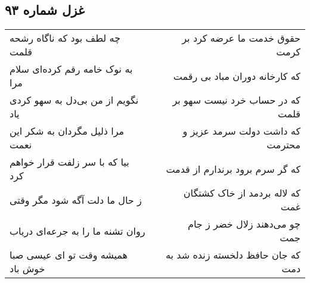\begin{center}
\section*{غزل شماره ۹۳}
\label{sec:sh093}
\begin{longtable}{l p{0.5cm} r}
چه لطف بود که ناگاه رشحه قلمت
&&
حقوق خدمت ما عرضه کرد بر کرمت
\\
به نوک خامه رقم کرده‌ای سلام مرا
&&
که کارخانه دوران مباد بی رقمت
\\
نگویم از من بی‌دل به سهو کردی یاد
&&
که در حساب خرد نیست سهو بر قلمت
\\
مرا ذلیل مگردان به شکر این نعمت
&&
که داشت دولت سرمد عزیز و محترمت
\\
بیا که با سر زلفت قرار خواهم کرد
&&
که گر سرم برود برندارم از قدمت
\\
ز حال ما دلت آگه شود مگر وقتی
&&
که لاله بردمد از خاک کشتگان غمت
\\
روان تشنه ما را به جرعه‌ای دریاب
&&
چو می‌دهند زلال خضر ز جام جمت
\\
همیشه وقت تو ای عیسی صبا خوش باد
&&
که جان حافظ دلخسته زنده شد به دمت
\\
\end{longtable}
\end{center}

